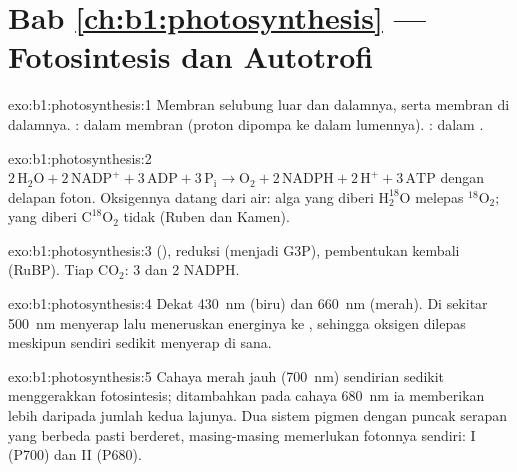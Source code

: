 \section*{Bab \ref{ch:b1:photosynthesis} --- Fotosintesis dan Autotrofi}

\begin{solution}{exo:b1:photosynthesis:1}
Membran selubung luar dan dalamnya, serta membran  di dalamnya.
: dalam membran  (proton dipompa ke dalam
lumennya). : dalam .
\end{solution}

\begin{solution}{exo:b1:photosynthesis:2}
$2\,\mathrm{H_2O} + 2\,\mathrm{NADP^+} + 3\,\mathrm{ADP} + 3\,\mathrm{P_i}
\to \mathrm{O_2} + 2\,\mathrm{NADPH} + 2\,\mathrm{H^+} + 3\,\mathrm{ATP}$
dengan delapan foton. Oksigennya datang dari air: alga yang diberi
$\mathrm{H_2^{18}O}$ melepas $\mathrm{^{18}O_2}$; yang diberi
$\mathrm{C^{18}O_2}$ tidak (Ruben dan Kamen).
\end{solution}

\begin{solution}{exo:b1:photosynthesis:3}
 (), reduksi (menjadi G3P), pembentukan kembali (RuBP).
Tiap $\mathrm{CO_2}$: 3  dan 2 NADPH.
\end{solution}

\begin{solution}{exo:b1:photosynthesis:4}
Dekat \qty{430}{nm} (biru) dan \qty{660}{nm} (merah). Di sekitar
\qty{500}{nm}  menyerap lalu meneruskan energinya ke
, sehingga oksigen dilepas meskipun  sendiri sedikit
menyerap di sana.
\end{solution}

\begin{solution}{exo:b1:photosynthesis:5}
Cahaya merah jauh (\qty{700}{nm}) sendirian sedikit menggerakkan
fotosintesis; ditambahkan pada cahaya \qty{680}{nm} ia memberikan lebih
daripada jumlah kedua lajunya. Dua sistem pigmen dengan puncak serapan
yang berbeda pasti  berderet, masing-masing memerlukan
fotonnya sendiri:  I (P700) dan  II (P680).
\end{solution}

